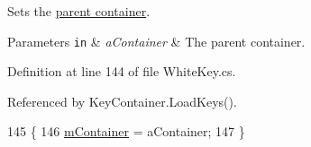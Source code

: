 Sets the \hyperlink{group___doc_key_contain}{parent container}. 


\begin{DoxyParams}[1]{Parameters}
\mbox{\tt in}  & {\em a\+Container} & The parent container. \\
\hline
\end{DoxyParams}


Definition at line 144 of file White\+Key.\+cs.



Referenced by Key\+Container.\+Load\+Keys().


\begin{DoxyCode}
145     \{
146         \hyperlink{group___white_key_priv_var_ga033fb0a319b61b61265201046c23e949}{mContainer} = aContainer;
147     \}
\end{DoxyCode}
